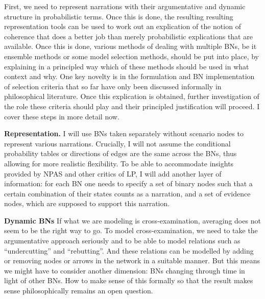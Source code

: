 \documentclass[11pt,dvipsnames,enabledeprecatedfontcommands]{scrartcl}
\begin{document}
First, we need to represent narrations with their argumentative and
dynamic structure in probabilistic terms. Once this is done, the
resulting resulting representation tools can be used to work out an
explication of the notion of coherence that does a better job than
merely probabilistic explications that are available. Once this is done,
various methods of dealing with multiple BNs, be it ensemble methods or
some model selection methods, should be put into place, by explaining in
a principled way which of these methods should be used in what context
and why. One key novelty is in the formulation and BN implementation of
selection criteria that so far have only been discussed informally in
philosophical literature. Once this explication is obtained, further
investigation of the role these criteria should play and their
principled justification will proceed. I cover these steps in more
detail now.

\noindent
\textbf{Representation.} I will use BNs taken separately without
scenario nodes to represent various narrations. Crucially, I will not
assume the conditional probability tables or directions of edges are the
same across the BNs, thus allowing for more realistic flexibility. To be
able to accommodate insights provided by NPAS and other critics of LP, I
will add another layer of information: for each BN one needs to specify
a set of binary nodes such that a certain combination of their states
counts as a narration, and a set of evidence nodes, which are supposed
to support this narration.

\noindent \textbf{Dynamic BNs} If what we are modeling is
cross-examination, averaging does not seem to be the right way to go. To
model cross-examination, we need to take the argumentative approach
seriously and to be able to model relations such as ``undercutting'' and
``rebutting''. And these relations can be modelled by adding or removing
nodes or arrows in the network in a suitable manner. But this means we
might have to consider another dimension: BNs changing through time in
light of other BNs. How to make sense of this formally so that the
result makes sense philosophically remains an open question.
\end{document}
